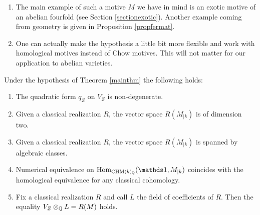\begin{remark}
\notready\label{hypothesismainthm}
\begin{enumerate}
\item The main example of such a motive $M$ we have in mind is an exotic motive of an abelian fourfold (see Section \ref{sectionexotic}). Another example coming from geometry is given in Proposition \ref{propfermat}.
\item\label{homvsrat} One can actually make the  hypothesis a little bit more flexible and work with homological motives instead of Chow motives. This will not matter for our application to abelian varieties.
\end{enumerate}
\end{remark}
\begin{prop}
\notready\label{tortura}
Under the hypothesis of Theorem \ref{mainthm} the following holds:
\begin{enumerate}
\item The quadratic form $q_Z$   on $V_Z$ is non-degenerate.
\item  Given a classical realization $R$, the vector space $R(M_{\vert{k}})$  is of dimension two.
\item Given a classical realization $R$, the vector space $R(M_{\vert{k}})$ is spanned by algebraic classes.
\item Numerical equivalence on $\Hom_{\CHM(k)_\Q}(\one,M_{\vert{k}})$ coincides with the homological equivalence for any classical cohomology.
\item\label{giorno} Fix a classical realization $R$ and call $L$ the field of coefficients of  $R$. Then the equality $V_Z\otimes _{\mathbb{Q}} L = R(M)$ holds.

\end{enumerate}
\end{prop}
